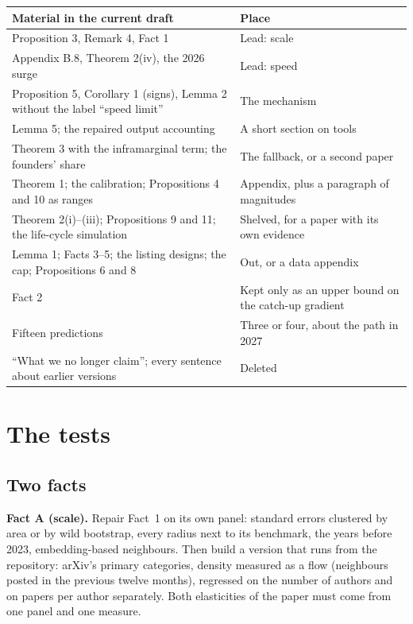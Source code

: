 \begin{center}\small
\begin{tabularx}{\textwidth}{@{}LP{2.2in}@{}}
\toprule
Material in the current draft & Place \\
\midrule
Proposition 3, Remark 4, Fact 1 & Lead: scale \\
Appendix B.8, Theorem 2(iv), the 2026 surge & Lead: speed \\
Proposition 5, Corollary 1 (signs), Lemma 2 without the label ``speed limit'' & The mechanism \\
Lemma 5; the repaired output accounting & A short section on tools \\
Theorem 3 with the inframarginal term; the founders' share & The fallback, or a second paper \\
Theorem 1; the calibration; Propositions 4 and 10 as ranges & Appendix, plus a paragraph of magnitudes \\
Theorem 2(i)--(iii); Propositions 9 and 11; the life-cycle simulation & Shelved, for a paper with its own evidence \\
Lemma 1; Facts 3--5; the listing designs; the cap; Propositions 6 and 8 & Out, or a data appendix \\
Fact 2 & Kept only as an upper bound on the catch-up gradient \\
Fifteen predictions & Three or four, about the path in 2027 \\
``What we no longer claim''; every sentence about earlier versions & Deleted \\
\bottomrule
\end{tabularx}
\end{center}

\section{The tests}\label{sec:tests}

\subsection{Two facts}

\textbf{Fact A (scale).} Repair Fact~1 on its own panel: standard errors clustered by area or by wild bootstrap, every radius next to its benchmark, the years before 2023, embedding-based neighbours. Then build a version that runs from the repository: arXiv's primary categories, density measured as a flow (neighbours posted in the previous twelve months), regressed on the number of authors and on papers per author separately. Both elasticities of the paper must come from one panel and one measure.

